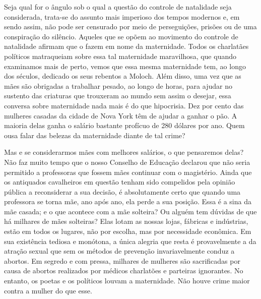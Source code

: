 Seja qual for o ângulo sob o qual a questão do controle de natalidade seja
considerada, trata-se do assunto mais imperioso dos tempos modernos e, em sendo
assim, não pode ser censurado por meio de perseguições, prisões ou de uma
conspiração do silêncio. Aqueles que se opõem ao movimento do controle
de natalidade afirmam que o fazem em nome da maternidade. Todos os
charlatães políticos matraqueiam sobre essa tal maternidade maravilhosa,
que quando examinamos mais de perto, vemos que essa mesma maternidade
tem, ao longo dos séculos, dedicado os seus rebentos a Moloch. Além
disso, uma vez que as mães são obrigadas a trabalhar pesado, ao longo de
horas, para ajudar no sustento das criaturas que trouxeram ao mundo sem
assim o desejar, essa conversa sobre maternidade nada mais é do que
hipocrisia. Dez por cento das mulheres casadas da cidade de Nova York
têm de ajudar a ganhar o pão. A maioria delas ganha o salário bastante
profícuo de 280 dólares por ano. Quem ousa falar das belezas da maternidade
diante de tal crime?

Mas e se considerarmos mães com melhores salários, o que pensaremos
delas? Não faz muito tempo que o nosso Conselho de Educação declarou que
não seria permitido a professoras que fossem mães continuar com o
magistério. Ainda que os antiquados cavalheiros em questão tenham sido
compelidos pela opinião pública a reconsiderar a sua decisão, é
absolutamente certo que quando uma professora se torna mãe, ano após
ano, ela perde a sua posição. Essa é a sina da mãe casada; e o que
acontece com a mãe solteira? Ou alguém tem dúvidas de que há milhares de
mães solteiras? Elas lotam as nossas lojas, fábricas e indústrias, estão
em todos os lugares, não por escolha, mas por necessidade econômica. Em
sua existência tediosa e monótona, a única alegria que resta é
provavelmente a da atração sexual que sem os métodos de prevenção
invariavelmente conduz a abortos. Em segredo e com pressa, milhares de\label{aborto}
mulheres são sacrificadas por causa de abortos realizados por médicos
charlatões e parteiras ignorantes. No entanto, os poetas e os políticos
louvam a maternidade. Não houve crime maior contra a mulher do que esse.

